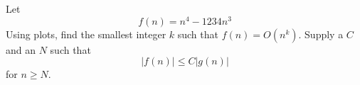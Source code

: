 Let
\[
f(n) = n^{4} - 1234n^3 
\]
Using plots, find the smallest integer $k$ such that $f(n) = O(n^k)$.
Supply a $C$ and an $N$ such that 
\[
|f(n)| \leq C |g(n)|
\]
for $n \geq N$.

